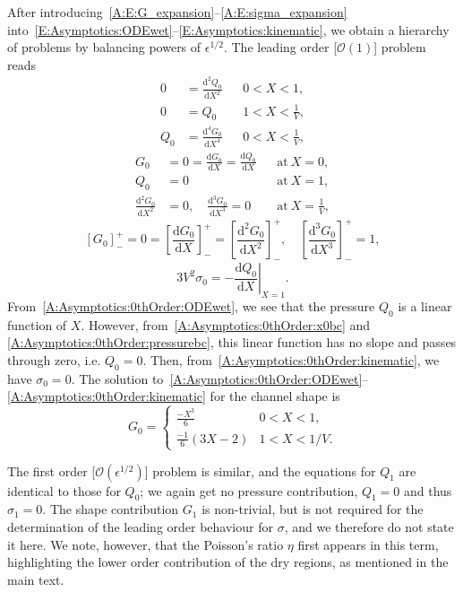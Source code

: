 \documentclass{jfm}
\newcommand{\dd}[2]{\frac{\mathrm{d} #1}{\mathrm{d} #2}}
\newcommand{\order}[1]{\mathcal{O}\left(#1\right)}
\newcommand{\poisson}{\eta} %
\begin{document}
After introducing~\eqref{A:E:G_expansion}--\eqref{A:E:sigma_expansion} into~\eqref{E:Asymptotics:ODEwet}--\eqref{E:Asymptotics:kinematic}, we obtain a hierarchy of problems by balancing powers of $\epsilon^{1/2}$. The leading order [$\order{1}$] problem reads
\begin{align}
0&= \dd{^2Q_0}{X^2} & &0 < X<1,\label{A:Asymptotics:0thOrder:ODEwet}\\
0&= Q_0  & &1 < X< \frac{1}{V},\\
Q_0 &= \dd{^4 G_0}{X^4} & & 0 < X < \frac{1}{V},
\end{align}
\begin{align}
G_0 &= 0 = \dd{G_0}{X}= \dd{Q_0}{X} & &\text{at}~X = 0,\label{A:Asymptotics:0thOrder:x0bc}\\
Q_0 &=0 & &\text{at}~X = 1,\label{A:Asymptotics:0thOrder:pressurebc}\\
\dd{^2 G_0}{X^2}&=0, \quad  \dd{^3 G_0}{X^3} = 0 & &\text{at}~X = \frac{1}{V},
\end{align}
\begin{equation}
\left[G_0\right]_-^+ =0 = \left[\dd{G_0}{X}\right]_-^+ = \left[\dd{^2 G_0}{X^2}\right]_-^+, \quad  \left[\dd{^3 G_0}{X^3}\right]_-^+ = 1,
\end{equation}
\begin{equation}\label{A:Asymptotics:0thOrder:kinematic}
3V^2 \sigma_0 = -\left.\dd{Q_0}{X}\right|_{X=1}.
\end{equation}
From~\eqref{A:Asymptotics:0thOrder:ODEwet}, we see that the pressure $Q_0$ is a linear function of $X$. However, from~\eqref{A:Asymptotics:0thOrder:x0bc} and \eqref{A:Asymptotics:0thOrder:pressurebc}, this linear function has no slope and passes through zero, i.e. $Q_0 = 0$. Then, from~\eqref{A:Asymptotics:0thOrder:kinematic}, we have $\sigma_0 = 0$. The solution to~\eqref{A:Asymptotics:0thOrder:ODEwet}--\eqref{A:Asymptotics:0thOrder:kinematic} for the channel shape is
\begin{equation}\label{A:Asymptotics:0thOrder:solution}
G_0  =\begin{cases}
\frac{-X^3}{6} & 0 < X < 1,\\
\frac{-1}{6}(3X-2) & 1 < X < 1/V.
\end{cases}
\end{equation}

The first order [$\order{\epsilon^{1/2}}$] problem is similar, and the equations for $Q_1$ are identical to those for $Q_0$; we again get no pressure contribution, $Q_1 = 0$ and thus $\sigma_1 = 0$. The shape contribution $G_1$ is non-trivial, but is not required for the determination of the leading order behaviour for $\sigma$, and we therefore do not state it here. We note, however, that the Poisson's ratio $\poisson$ first appears in this term, highlighting the lower order contribution of the dry regions, as mentioned in the main text.
\end{document}
